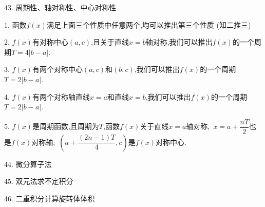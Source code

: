 43. 周期性、轴对称性、中心对称性
\begin{theorem}
	1. 函数$f(x)$满足上面三个性质中任意两个,均可以推出第三个性质 (知二推三)
	
	2. $f(x)$有对称中心$(a,c)$,且关于直线$x=b$轴对称,我们可以推出$f(x)$的一个周期$T=4|b-a|$.
	
	3. $f(x)$有两个对称中心$(a,c)$和$(b,c)$,我们可以推出$f(x)$的一个周期$T=2|b-a|$.
	
	4. $f(x)$有两个对称轴直线$x=a$和直线$x=b$,我们可以推出$f(x)$的一个周期$T=2|b-a|$.
	
	5. $f(x)$是周期函数,且周期为$T$,函数$f(x)$关于直线$x=a$轴对称,\ $x=a+\dfrac{nT}{2}$也是$f(x)$对称轴;\ $(a+\dfrac{(2n-1)T}{4},c)$是$f(x)$对称中心.
\end{theorem}

44. 微分算子法

45. 双元法求不定积分

46. 二重积分计算旋转体体积












